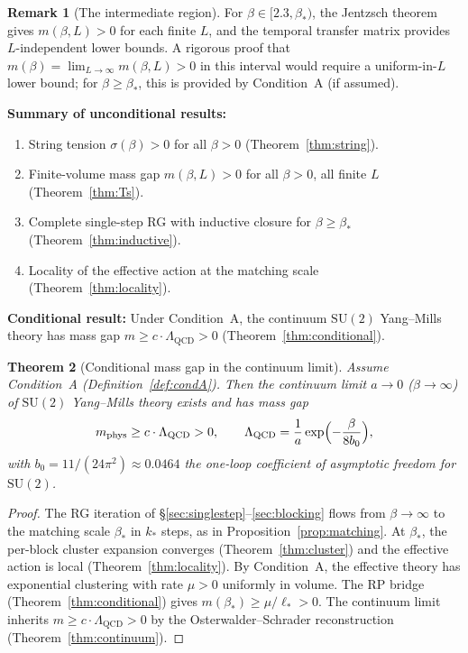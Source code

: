 \documentclass[11pt]{article}
\newtheorem{theorem}{Theorem}[section]
\theoremstyle{definition}
\newtheorem{remark}[theorem]{Remark}
\newcommand{\SU}{\mathrm{SU}}
\newcommand{\Lam}{\Lambda_{\mathrm{QCD}}}
\begin{document}
\begin{remark}[The intermediate region]\label{rem:crossover}
For $\beta\in[2.3,\beta_*)$, the Jentzsch theorem gives $m(\beta,L)>0$
for each finite $L$, and the temporal transfer matrix provides
$L$-independent lower bounds.  A rigorous proof
that $m(\beta)=\lim_{L\to\infty}m(\beta,L)>0$ in this interval
would require a uniform-in-$L$ lower bound; for $\beta\ge\beta_*$,
this is provided by Condition~A (if assumed).
\end{remark}

\textbf{Summary of unconditional results:}
\begin{enumerate}[nosep]
\item String tension $\sigma(\beta)>0$ for all $\beta>0$
(Theorem~\ref{thm:string}).
\item Finite-volume mass gap $m(\beta,L)>0$ for all $\beta>0$,
all finite $L$ (Theorem~\ref{thm:Ts}).
\item Complete single-step RG with inductive closure for
$\beta\ge\beta_*$ (Theorem~\ref{thm:inductive}).
\item Locality of the effective action at the matching scale
(Theorem~\ref{thm:locality}).
\end{enumerate}

\textbf{Conditional result:}
Under Condition~A, the continuum $\SU(2)$ Yang--Mills theory
has mass gap $m\ge c\cdot\Lam>0$
(Theorem~\ref{thm:conditional}).

\begin{theorem}[Conditional mass gap in the continuum limit]
\label{thm:unconditional}
Assume Condition~A (Definition~\ref{def:condA}).
Then the continuum limit $a\to 0$ ($\beta\to\infty$) of $\SU(2)$
Yang--Mills theory exists and has mass gap
\begin{equation}
m_{\mathrm{phys}}\ge c\cdot\Lam>0,
\qquad\Lam=\frac{1}{a}\exp\Bigl(-\frac{\beta}{8b_0}\Bigr),
\end{equation}
with $b_0=11/(24\pi^2)\approx 0.0464$ the one-loop
coefficient of asymptotic freedom for $\SU(2)$.
\end{theorem}

\begin{proof}
The RG iteration of \S\ref{sec:singlestep}--\ref{sec:blocking}
flows from $\beta\to\infty$ to the matching scale $\beta_*$ in $k_*$
steps, as in Proposition~\ref{prop:matching}.  At $\beta_*$,
the per-block cluster expansion converges (Theorem~\ref{thm:cluster})
and the effective action is local (Theorem~\ref{thm:locality}).
By Condition~A, the effective theory has exponential clustering
with rate $\mu>0$ uniformly in volume.  The RP bridge
(Theorem~\ref{thm:conditional}) gives
$m(\beta_*)\ge\mu/\ell_*>0$.
The continuum limit inherits $m\ge c\cdot\Lam>0$ by the
Osterwalder--Schrader reconstruction (Theorem~\ref{thm:continuum}).
\end{proof}
\end{document}
